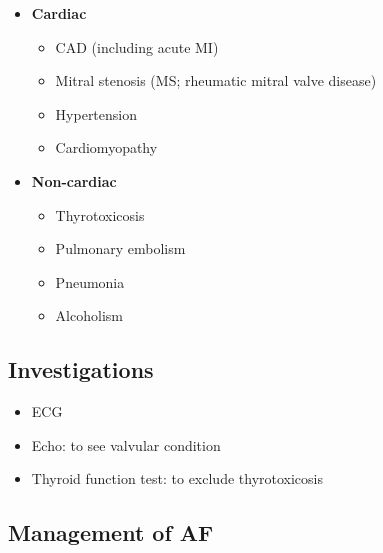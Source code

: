 \documentclass[
  12pt,
]{memoir}
\providecommand{\tightlist}{%
  \setlength{\itemsep}{0pt}\setlength{\parskip}{0pt}}
\begin{document}
\begin{itemize}
\tightlist
\item
  \textbf{Cardiac}

  \begin{itemize}
  \tightlist
  \item
    CAD (including acute MI)
  \item
    Mitral stenosis (MS; rheumatic mitral valve disease)
  \item
    Hypertension
  \item
    Cardiomyopathy
  \end{itemize}
\item
  \textbf{Non-cardiac}

  \begin{itemize}
  \tightlist
  \item
    Thyrotoxicosis
  \item
    Pulmonary embolism
  \item
    Pneumonia
  \item
    Alcoholism
  \end{itemize}
\end{itemize}

\hypertarget{investigations}{%
\subsection{Investigations}\label{investigations}}

\begin{itemize}
\tightlist
\item
  ECG
\item
  Echo: to see valvular condition
\item
  Thyroid function test: to exclude thyrotoxicosis
\end{itemize}

\hypertarget{management-of-af}{%
\subsection{Management of AF}\label{management-of-af}}
\end{document}

